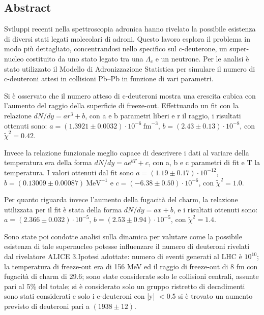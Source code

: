\documentclass[12pt,a4paper]{book}
\begin{document}
	\newpage
	
	\subsection*{Abstract}
	Sviluppi recenti nella spettroscopia adronica hanno rivelato la possibile esistenza di diversi stati legati molecolari di adroni. Questo lavoro esplora il problema in modo più dettagliato, concentrandosi nello specifico sul c-deuterone, un super-nucleo costituito da uno stato legato tra una $\Lambda_c$ e un neutrone. Per le analisi è stato utilizzato il Modello di Adronizzazione Statistica per simulare il numero di c-deuteroni attesi in collisioni Pb–Pb in funzione di vari parametri.
	
	Si è osservato che il numero atteso di c-deuteroni mostra una crescita cubica con l’aumento del raggio della superficie di freeze-out. Effettuando un fit con la relazione $dN/dy = ar^3 + b$, con a e b parametri liberi e r il raggio, i risultati ottenuti sono: $a = (1.3921 \pm 0.0032) \cdot 10^{-6}\ \text{fm}^{-3}$, $b = (2.43 \pm 0.13) \cdot 10^{-8}$, con $\tilde{\chi}^2 = 0.42$.
	
	Invece la relazione funzionale meglio capace di descrivere i dati al variare della temperatura era della forma $dN/dy = ae^{bT} + c$, con a, b e c parametri di fit e T la temperatura. I valori ottenuti dal fit sono $a = (1.19 \pm 0.17) \cdot 10^{-12}$, $b = (0.13009 \pm 0.00087)\ \text{MeV}^{-1}$ e $c = (-6.38 \pm 0.50) \cdot 10^{-6}$, con $\tilde{\chi}^2 = 1.0$.
	
	Per quanto riguarda invece l’aumento della fugacità del charm, la relazione utilizzata per il fit è stata della forma $dN/dy = ax + b$, e i risultati ottenuti sono: $a = (2.366 \pm 0.032) \cdot 10^{-5}$, $b = (2.53 \pm 0.94) \cdot 10^{-5}$, con $\tilde{\chi}^2 = 1.4$.
	
	Sono state poi condotte analisi sulla dinamica per valutare come la possibile esistenza di tale supernucleo potesse influenzare il numero di deuteroni rivelati dal rivelatore ALICE 3.Ipotesi adottate: numero di eventi generati al LHC è $10^{10}$; la temperatura di freeze-out era di 156 MeV ed il raggio di freeze-out di 8 fm con fugacità di charm di 29.6; sono state considerate solo le collisioni centrali, assunte pari al 5\% del totale; si è considerato solo un gruppo ristretto di decadimenti sono stati considerati e solo i c-deuteroni con |y| $< $0.5 si è trovato un aumento previsto di deuteroni pari a $(1938 \pm 12)$.
	
	
	\tableofcontents  %
	
\end{document}
